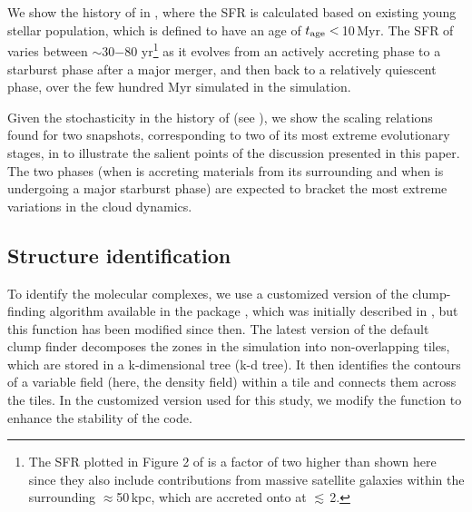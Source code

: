 \IfFileExists{emulateapjlegacy.cls}{\documentclass[iop]{emulateapjlegacy}}{\documentclass[iop]{emulateapj}}
\begin{document}
We show the \SF history of \flower in ,
where the SFR is calculated based on existing young stellar population, which is
defined to have an age of $t_{\rm age}<$\,10\,Myr.
The SFR of \flower varies between $\sim$30$-$80\,\Msun\,yr\pmOne\footnote{
The SFR plotted in Figure 2 of \citet{Pallottini17b}
is a factor of two higher than shown here since they also include contributions from
massive satellite galaxies within the surrounding $\approx$50\,kpc, which
are accreted onto \flower at \z$\lesssim$\,2.}
as it evolves from an actively accreting phase to
a starburst phase after a major merger, and then back to a relatively quiescent phase,
over the few hundred Myr simulated in the simulation.

Given the stochasticity in the \SF history of \flower (see ),
we show the scaling relations found for two snapshots, corresponding to two of its most extreme evolutionary stages,
in  to illustrate the salient points of the discussion presented in this paper.
The two phases (when \flower is accreting materials from its surrounding 
and when \flower is undergoing a major starburst phase) are expected to bracket the most extreme variations in the cloud dynamics. 


\subsection{Structure identification} \label{sec:method}
To identify the molecular complexes, we use a customized version of the clump-finding algorithm available in the  package  \citep{Turk2011a}, which was initially described in \citet{Smith09a}, but this function has been modified since then.
%
The latest version of the default  clump finder decomposes the zones in the simulation into non-overlapping tiles, which are stored in a k-dimensional tree (k-d tree). It then identifies the contours of a variable field (here, the density field) within a tile and connects them across the tiles.
In the customized version used for this study, we modify the function to enhance the stability of the code.
\end{document}
